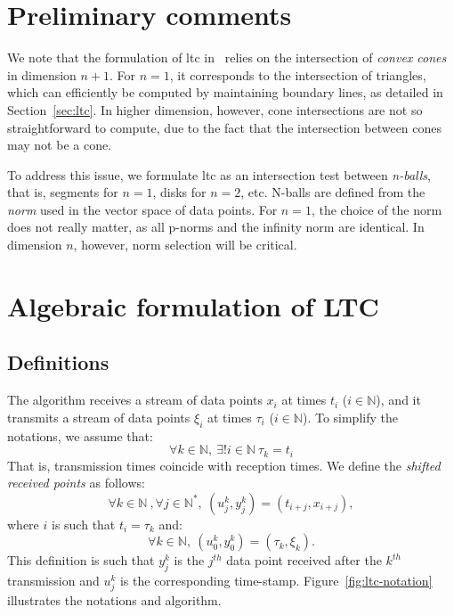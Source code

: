 \section{Preliminary comments}

We note that the formulation of \acrshort{ltc}
in~\cite{schoellhammer2004lightweight} relies on the intersection of
\emph{convex cones} in dimension $n+1$. For $n=1$, it corresponds to the
intersection of triangles, which can efficiently be computed by maintaining
boundary lines, as detailed in Section~\ref{sec:ltc}. In higher
dimension, however, cone intersections are not so straightforward to compute,
due to the fact that the intersection between cones may not be a cone.

To address this issue, we formulate \acrshort{ltc} as an intersection test
between \emph{n-balls}, that is, segments for $n=1$, disks for $n=2$, etc.
N-balls are defined from the \emph{norm} used in the vector space of data
points. For $n=1$, the choice of the norm does not really matter, as all p-norms
and the infinity norm are identical. In dimension $n$, however, norm selection
will be critical.

\section{Algebraic formulation of LTC}

\subsection{Definitions}

The algorithm receives a stream of data points $x_i$ at times $t_i$
($i \in \mathbb{N}$), and it transmits a stream of data points $\xi_i$ at times
$\tau_i$ ($i \in \mathbb{N}$). To simplify the notations, we assume that:
\begin{equation}
\forall k \in \mathbb{N}, \  \exists ! i \in \mathbb{N} \  \tau_k = t_i
\end{equation}
That is, transmission times coincide with reception times.
We define the \emph{shifted received points} as follows:
\begin{equation}
\label{eq:ltc-2}
\forall k \in \mathbb{N}\ , \forall j \in \mathbb{N^*},\ (u^k_j, y^k_j) = (t_{i+j}, x_{i+j}), 
\end{equation}
where $i$ is such that $t_i = \tau_k$ and:
\begin{equation}
\label{eq:ltc-3}
\forall k \in \mathbb{N},\  (u^k_0, y^k_0) = (\tau_k, \xi_k).
\end{equation}
This definition is such that $y^k_j$ is the $j^{th}$ data point received
after the $k^{th}$ transmission and $u^k_j$ is the corresponding time-stamp.
Figure~\ref{fig:ltc-notation} illustrates the notations and algorithm.


